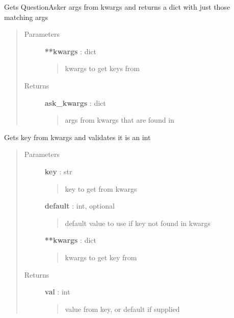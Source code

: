 \documentclass[letterpaper,10pt,english]{sphinxmanual}
\begin{document}
\begin{fulllineitems}
\label{pytan.utils:pytan.utils.get_ask_kwargs}
Gets QuestionAsker args from kwargs and returns a dict with just those matching args
\begin{quote}\begin{description}
\item[{Parameters}] \leavevmode
\textbf{**kwargs} : dict
\begin{quote}

kwargs to get keys from
\end{quote}

\item[{Returns}] \leavevmode
\textbf{ask\_kwargs} : dict
\begin{quote}

args from kwargs that are found in {\hyperref[pytan.constants:pytan.constants.ASK_KWARGS]{}}
\end{quote}

\end{description}\end{quote}

\end{fulllineitems}


\begin{fulllineitems}
\label{pytan.utils:pytan.utils.get_kwargs_int}
Gets key from kwargs and validates it is an int
\begin{quote}\begin{description}
\item[{Parameters}] \leavevmode
\textbf{key} : str
\begin{quote}

key to get from kwargs
\end{quote}

\textbf{default} : int, optional
\begin{quote}

default value to use if key not found in kwargs
\end{quote}

\textbf{**kwargs} : dict
\begin{quote}

kwargs to get key from
\end{quote}

\item[{Returns}] \leavevmode
\textbf{val} : int
\begin{quote}

value from key, or default if supplied
\end{quote}

\end{description}\end{quote}

\end{fulllineitems}
\end{document}
